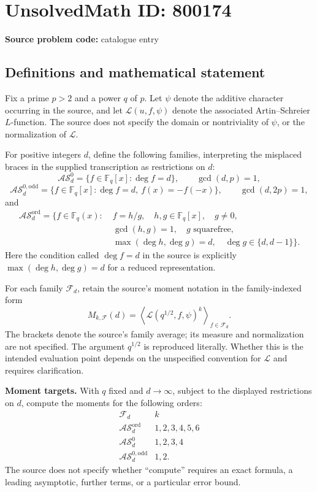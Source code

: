 \documentclass[11pt]{article}
\newcommand{\F}{\mathbb{F}}
\begin{document}
\section*{UnsolvedMath ID: 800174}
\textbf{Source problem code:} catalogue entry
\subsection{Definitions and mathematical statement}
Fix a prime \(p>2\) and a power \(q\) of \(p\). Let \(\psi\) denote the additive character occurring in the source, and let \(\mathcal L(u,f,\psi)\) denote the associated Artin--Schreier \(L\)-function. The source does not specify the domain or nontriviality of \(\psi\), or the normalization of \(\mathcal L\).

For positive integers \(d\), define the following families, interpreting the misplaced braces in the supplied transcription as restrictions on \(d\):
\[
\mathcal{AS}^{0}_d=\{f\in\F_q[x]:\deg f=d\},\qquad \gcd(d,p)=1,
\]
\[
\mathcal{AS}^{0,\mathrm{odd}}_d
=\{f\in\F_q[x]:\deg f=d,\ f(x)=-f(-x)\},
\qquad \gcd(d,2p)=1,
\]
and
\[
\begin{split}
\mathcal{AS}^{\mathrm{ord}}_d
=\bigl\{f\in\F_q(x):\;&f=h/g,\quad h,g\in\F_q[x],\quad g\ne0,\\
&\gcd(h,g)=1,\quad g\text{ squarefree},\\
&\max(\deg h,\deg g)=d,\quad \deg g\in\{d,d-1\}\bigr\}.
\end{split}
\]
Here the condition called \(\deg f=d\) in the source is explicitly \(\max(\deg h,\deg g)=d\) for a reduced representation.

For each family \(\mathcal F_d\), retain the source's moment notation in the family-indexed form
\[
M_{k,\mathcal F}(d)
=\left\langle\mathcal L(q^{1/2},f,\psi)^k\right\rangle_{f\in\mathcal F_d}.
\]
The brackets denote the source's family average; its measure and normalization are not specified. The argument \(q^{1/2}\) is reproduced literally. Whether this is the intended evaluation point depends on the unspecified convention for \(\mathcal L\) and requires clarification.

\textbf{Moment targets.} With \(q\) fixed and \(d\to\infty\), subject to the displayed restrictions on \(d\), compute the moments for the following orders:
\[
\begin{array}{c|c}
\mathcal F_d&k\\ \hline
\mathcal{AS}^{\mathrm{ord}}_d&1,2,3,4,5,6\\
\mathcal{AS}^{0}_d&1,2,3,4\\
\mathcal{AS}^{0,\mathrm{odd}}_d&1,2.
\end{array}
\]
The source does not specify whether ``compute'' requires an exact formula, a leading asymptotic, further terms, or a particular error bound.
\end{document}
